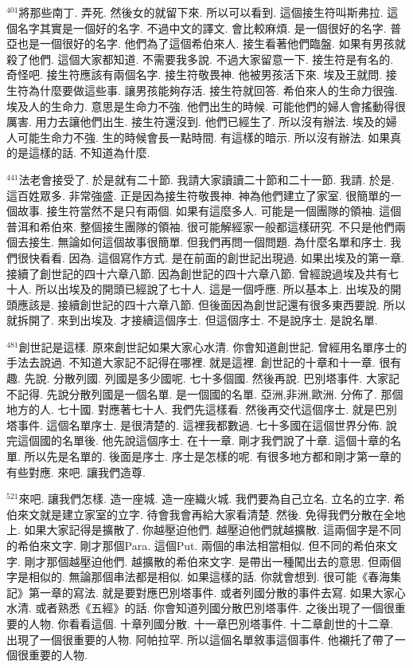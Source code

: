 \documentclass{book}
\begin{document}
$^{401}$將那些南丁.
弄死.
然後女的就留下來.
所以可以看到.
這個接生符叫斯弗拉.
這個名字其實是一個好的名字.
不過中文的譯文.
會比較麻煩.
是一個很好的名字.
普亞也是一個很好的名字.
他們為了這個希伯來人.
接生看著他們臨盤.
如果有男孩就殺了他們.
這個大家都知道.
不需要我多說.
不過大家留意一下.
接生符是有名的.
奇怪吧.
接生符應該有兩個名字.
接生符敬畏神.
他被男孩活下來.
埃及王就問.
接生符為什麼要做這些事.
讓男孩能夠存活.
接生符就回答.
希伯來人的生命力很強.
埃及人的生命力.
意思是生命力不強.
他們出生的時候.
可能他們的婦人會搖動得很厲害.
用力去讓他們出生.
接生符還沒到.
他們已經生了.
所以沒有辦法.
埃及的婦人可能生命力不強.
生的時候會長一點時間.
有這樣的暗示.
所以沒有辦法.
如果真的是這樣的話.
不知道為什麼.

$^{441}$法老會接受了.
於是就有二十節.
我請大家讀讀二十節和二十一節.
我請.
於是.
這百姓眾多.
非常強盛.
正是因為接生符敬畏神.
神為他們建立了家室.
很簡單的一個故事.
接生符當然不是只有兩個.
如果有這麼多人.
可能是一個團隊的領袖.
這個普洱和希伯來.
整個接生團隊的領袖.
很可能解經家一般都這樣研究.
不只是他們兩個去接生.
無論如何這個故事很簡單.
但我們再問一個問題.
為什麼名單和序士.
我們很快看看.
因為.
這個寫作方式.
是在前面的創世記出現過.
如果出埃及的第一章.
接續了創世記的四十六章八節.
因為創世記的四十六章八節.
曾經說過埃及共有七十人.
所以出埃及的開頭已經說了七十人.
這是一個呼應.
所以基本上.
出埃及的開頭應該是.
接續創世記的四十六章八節.
但後面因為創世記還有很多東西要說.
所以就拆開了.
來到出埃及.
才接續這個序士.
但這個序士.
不是說序士.
是說名單.

$^{481}$創世記是這樣.
原來創世記如果大家心水清.
你會知道創世記.
曾經用名單序士的手法去說過.
不知道大家記不記得在哪裡.
就是這裡.
創世記的十章和十一章.
很有趣.
先說.
分散列國.
列國是多少國呢.
七十多個國.
然後再說.
巴別塔事件.
大家記不記得.
先說分散列國是一個名單.
是一個國的名單.
亞洲,非洲,歐洲.
分佈了.
那個地方的人.
七十國.
對應著七十人.
我們先這樣看.
然後再交代這個序士.
就是巴別塔事件.
這個名單序士.
是很清楚的.
這裡我都數過.
七十多國在這個世界分佈.
說完這個國的名單後.
他先說這個序士.
在十一章.
剛才我們說了十章.
這個十章的名單.
所以先是名單的.
後面是序士.
序士是怎樣的呢.
有很多地方都和剛才第一章的有些對應.
來吧.
讓我們造尊.

$^{521}$來吧.
讓我們怎樣.
造一座城.
造一座織火城.
我們要為自己立名.
立名的立字.
希伯來文就是建立家室的立字.
待會我會再給大家看清楚.
然後.
免得我們分散在全地上.
如果大家記得是擴散了.
你越壓迫他們.
越壓迫他們就越擴散.
這兩個字是不同的希伯來文字.
剛才那個Para.
這個Put.
兩個的串法相當相似.
但不同的希伯來文字.
剛才那個越壓迫他們.
越擴散的希伯來文字.
是帶出一種闖出去的意思.
但兩個字是相似的.
無論那個串法都是相似.
如果這樣的話.
你就會想到.
很可能《春海集記》第一章的寫法.
就是要對應巴別塔事件.
或者列國分散的事件去寫.
如果大家心水清.
或者熟悉《五經》的話.
你會知道列國分散巴別塔事件.
之後出現了一個很重要的人物.
你看看這個.
十章列國分散.
十一章巴別塔事件.
十二章創世的十二章.
出現了一個很重要的人物.
阿帕拉罕.
所以這個名單敘事這個事件.
他襯托了帶了一個很重要的人物.
\end{document}
